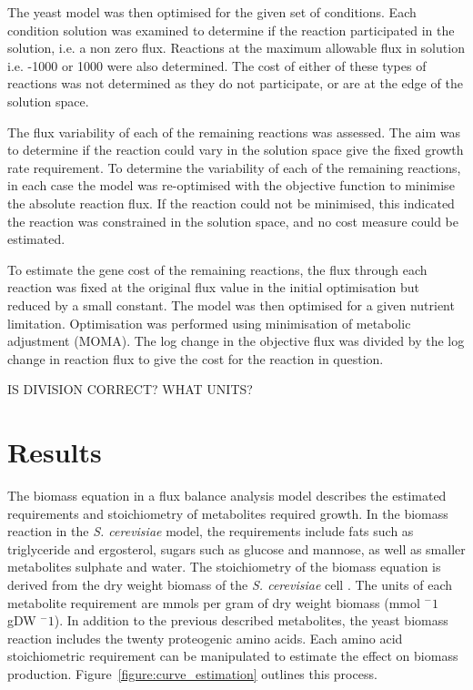 The yeast model was then optimised for the given set of conditions. Each condition solution was examined to determine if the reaction participated in the solution, i.e. a non zero flux. Reactions at the maximum allowable flux in solution i.e. -1000 or 1000 were also determined. The cost of either of these types of reactions was not determined as they do not participate, or are at the edge of the solution space.

The flux variability of each of the remaining reactions was assessed. The aim was to determine if the reaction could vary in the solution space give the fixed growth rate requirement. To determine the variability of each of the remaining reactions, in each case the model was re-optimised with the objective function to minimise the absolute reaction flux. If the reaction could not be minimised, this indicated the reaction was constrained in the solution space, and no cost measure could be estimated.

To estimate the gene cost of the remaining reactions, the flux through each reaction was fixed at the original flux value in the initial optimisation but reduced by a small constant. The model was then optimised for a given nutrient limitation. Optimisation was performed using minimisation of metabolic adjustment (MOMA). The log change in the objective flux was divided by the log change in reaction flux to give the cost for the reaction in question.

IS DIVISION CORRECT?
WHAT UNITS?

\clearpage

\section{Results}

The biomass equation in a flux balance analysis model describes the estimated requirements and stoichiometry of metabolites required growth. In the biomass reaction in the \emph{S. cerevisiae} model, the requirements include fats such as triglyceride and ergosterol, sugars such as glucose and mannose, as well as smaller metabolites sulphate and water. The stoichiometry of the biomass equation is derived from the dry weight biomass of the \emph{S. cerevisiae} cell \cite{duarte2004}. The units of each metabolite requirement are mmols per gram of dry weight biomass (mmol $^-1$ gDW $^-1$). In addition to the previous described metabolites, the yeast biomass reaction includes the twenty proteogenic amino acids. Each amino acid stoichiometric requirement can be manipulated to estimate the effect on biomass production. Figure~\vref{figure:curve_estimation} outlines this process.

